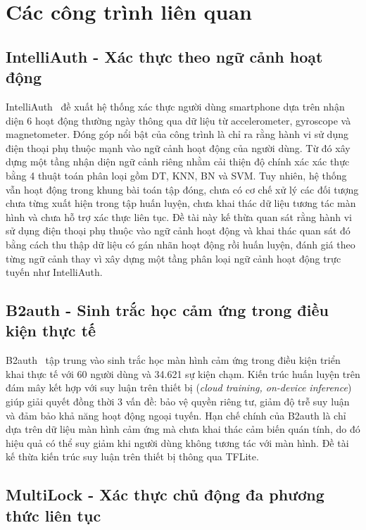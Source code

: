 \documentclass[../DoAn.tex]{subfiles}
\begin{document}
\section{Các công trình liên quan}
\label{sec:congtrinh}

\subsection{IntelliAuth - Xác thực theo ngữ cảnh hoạt động}

IntelliAuth~\cite{intelliauth} đề xuất hệ thống xác thực người dùng smartphone dựa trên nhận diện 6 hoạt động thường ngày thông qua dữ liệu từ accelerometer, gyroscope và magnetometer. Đóng góp nổi bật của công trình là chỉ ra rằng hành vi sử dụng điện thoại phụ thuộc mạnh vào ngữ cảnh hoạt động của người dùng. Từ đó xây dựng một tầng nhận diện ngữ cảnh riêng nhằm cải thiện độ chính xác xác thực bằng 4 thuật toán phân loại gồm DT, KNN, BN và SVM. Tuy nhiên, hệ thống vẫn hoạt động trong khung bài toán tập đóng, chưa có cơ chế xử lý các đối tượng chưa từng xuất hiện trong tập huấn luyện, chưa khai thác dữ liệu tương tác màn hình và chưa hỗ trợ xác thực liên tục. Đề tài này kế thừa quan sát rằng hành vi sử dụng điện thoại phụ thuộc vào ngữ cảnh hoạt động và khai thác quan sát đó bằng cách thu thập dữ liệu có gán nhãn hoạt động rồi huấn luyện, đánh giá theo từng ngữ cảnh thay vì xây dựng một tầng phân loại ngữ cảnh hoạt động trực tuyến như IntelliAuth.

\subsection{B2auth - Sinh trắc học cảm ứng trong điều kiện thực tế}

B2auth~\cite{b2auth} tập trung vào sinh trắc học màn hình cảm ứng trong điều kiện triển khai thực tế với 60 người dùng và 34.621 sự kiện chạm. Kiến trúc huấn luyện trên đám mây kết hợp với suy luận trên thiết bị (\textit{cloud training, on-device inference}) giúp giải quyết đồng thời 3 vấn đề: bảo vệ quyền riêng tư, giảm độ trễ suy luận và đảm bảo khả năng hoạt động ngoại tuyến. Hạn chế chính của B2auth là chỉ dựa trên dữ liệu màn hình cảm ứng mà chưa khai thác cảm biến quán tính, do đó hiệu quả có thể suy giảm khi người dùng không tương tác với màn hình. Đề tài kế thừa kiến trúc suy luận trên thiết bị thông qua TFLite.

\subsection{MultiLock - Xác thực chủ động đa phương thức liên tục}
\end{document}
